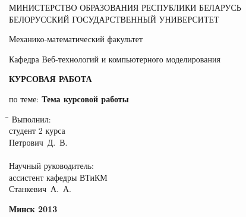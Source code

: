 \begin{titlepage}

\begin{center} 
 МИНИСТЕРСТВО ОБРАЗОВАНИЯ РЕСПУБЛИКИ БЕЛАРУСЬ\\
{БЕЛОРУССКИЙ ГОСУДАРСТВЕННЫЙ УНИВЕРСИТЕТ}

{Механико-математический факультет}

{Кафедра Веб-технологий и компьютерного моделирования}
\end{center}
\medskip

\vspace{5cm}

\begin{center}
{\bfseries КУРСОВАЯ РАБОТА}\\ \vspace{0.3cm}

по теме: {\bfseries Тема курсовой работы}\\


\end{center}
\vspace{7cm}

\begin{tabbing}
\hspace{9cm} \= \kill \>
Выполнил: \+ \\
студент 2 курса\\
Петрович~Д.~В.\\
\\
Научный руководитель:  \\
ассистент кафедры ВТиКМ\\
Станкевич~А.~А.
\end{tabbing}
\vspace{4cm}

\begin{center}
 \bfseries Минск 2013
\end{center}

\end{titlepage}